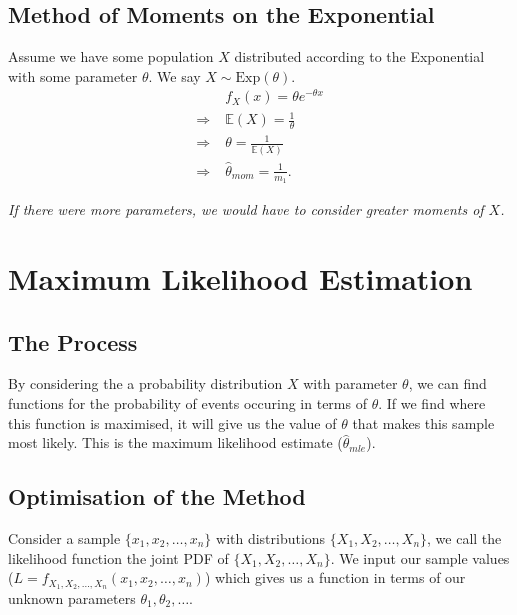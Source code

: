 \documentclass[a4paper, 12pt, twoside]{article}
\begin{document}
\subsection{Method of Moments on the Exponential}

Assume we have some population $X$ distributed according to the
Exponential with some parameter $\theta$. We say
$X \sim \text{Exp}(\theta)$.
\begin{align*}
                   & f_X(x) = \theta e^{-\theta x} \tag{x $>$ 0} \\
    \Rightarrow \; & \mathbb{E}(X) = \frac{1}{\theta}            \\
    \Rightarrow \; & \theta = \frac{1}{\mathbb{E}(X)}            \\
    \Rightarrow \; & \hat{\theta}_{mom} = \frac{1}{m_1}.
\end{align*}

\textit{If there were more parameters, we would have to consider
    greater moments of $X$.}

\section{Maximum Likelihood Estimation}

\subsection{The Process}

By considering the a probability distribution $X$ with parameter $\theta$,
we can find functions for the probability of events occuring in terms
of $\theta$. If we find where this function is maximised, it will give us
the value of $\theta$ that makes this sample most likely. This is the
maximum likelihood estimate ($\hat\theta_{mle}$).

\subsection{Optimisation of the Method}

Consider a sample $\{x_1, x_2, \ldots, x_n\}$ with distributions
$\{X_1, X_2, \ldots, X_n\}$, we call the likelihood function the
joint PDF of $\{X_1, X_2, \ldots, X_n\}$. We input our sample values
($L = f_{X_1, X_2, \ldots, X_n}(x_1, x_2, \ldots, x_n)$) which gives us
a function in terms of our unknown parameters $\theta_1, \theta_2, \ldots$.

\vspace{\baselineskip}
\end{document}
